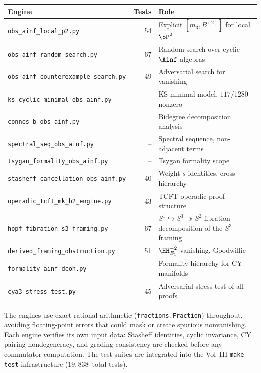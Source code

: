 \begin{center}
\renewcommand{\arraystretch}{1.15}
\small
\begin{tabular}{lrl}
 \toprule
 \textbf{Engine} & \textbf{Tests} & \textbf{Role} \\
 \midrule
 \texttt{obs\_ainf\_local\_p2.py} & 54 &
 Explicit $[m_3, B^{(2)}]$ for local $\bP^2$ \\
 \texttt{obs\_ainf\_random\_search.py} & 67 &
 Random search over cyclic $\Ainf$-algebras \\
 \texttt{obs\_ainf\_counterexample\_search.py} & 49 &
 Adversarial search for vanishing \\
 \texttt{ks\_cyclic\_minimal\_obs\_ainf.py} & -- &
 KS minimal model, $117/1280$ nonzero \\
 \texttt{connes\_b\_obs\_ainf.py} & -- &
 Bidegree decomposition analysis \\
 \texttt{spectral\_seq\_obs\_ainf.py} & -- &
 Spectral sequence, non-adjacent terms \\
 \texttt{tsygan\_formality\_obs\_ainf.py} & -- &
 Tsygan formality scope \\
 \texttt{stasheff\_cancellation\_obs\_ainf.py} & 40 &
 Weight-$s$ identities, cross-hierarchy \\
 \texttt{operadic\_tcft\_mk\_b2\_engine.py} & 43 &
 TCFT operadic proof structure \\
 \texttt{hopf\_fibration\_s3\_framing.py} & 67 &
 $S^1 \hookrightarrow S^3 \twoheadrightarrow S^2$
 fibration decomposition of the $S^3$-framing \\
 \texttt{derived\_framing\_obstruction.py} & 51 &
 $\HH^{-2}_{E_1}$ vanishing, Goodwillie \\
 \texttt{formality\_ainf\_dcoh.py} & -- &
 Formality hierarchy for CY manifolds \\
 \texttt{cya3\_stress\_test.py} & 45 &
 Adversarial stress test of all proofs \\
 \bottomrule
\end{tabular}
\end{center}

\begin{remark}
\label{rem:computational-methodology}
The engines use exact rational arithmetic
(\texttt{fractions.Fraction}) throughout, avoiding floating-point
errors that could mask or create spurious nonvanishing.  Each
engine verifies its own input data: Stasheff identities, cyclic
invariance, CY pairing nondegeneracy, and grading consistency
are checked before any commutator computation.  The test suites
are integrated into the Vol~III \texttt{make test} infrastructure
($19{,}838$~total tests).
\end{remark}

